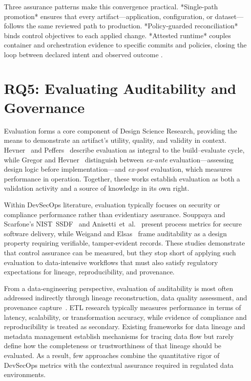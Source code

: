 Three assurance patterns make this convergence practical. *Single-path
promotion* ensures that every artifact—application, configuration, or
dataset—follows the same reviewed path to production. *Policy-guarded
reconciliation* binds control objectives to each applied change.
*Attested runtime* couples container and orchestration evidence to specific
commits and policies, closing the loop between declared intent and observed
outcome \cite{anisetti_devsecops-based_2022, souppaya_secure_2022}.

\section{RQ5: Evaluating Auditability and Governance}

Evaluation forms a core component of Design Science Research, providing the
means to demonstrate an artifact's utility, quality, and validity in context.
Hevner~\cite{hevner_design_2004} and Peffers~\cite{peffers_design_2007}
describe evaluation as integral to the build–evaluate cycle, while
Gregor and Hevner~\cite{gregor_positioning_2013} distinguish between
\textit{ex-ante} evaluation—assessing design logic before implementation—and
\textit{ex-post} evaluation, which measures performance in operation.
Together, these works establish evaluation as both a validation activity and a
source of knowledge in its own right.

Within DevSecOps literature, evaluation typically focuses on security or
compliance performance rather than evidentiary assurance.
Souppaya and Scarfone's NIST~SSDF~\cite{souppaya_secure_2022} and
Anisetti~et~al.~\cite{anisetti_devsecops-based_2022} present process metrics for
secure software delivery, while Weigand and
Elsas~\cite{weigand_auditability_2019} frame auditability as a design property
requiring verifiable, tamper-evident records.
These studies demonstrate that control assurance can be measured, but they stop
short of applying such evaluation to data-intensive workflows that must also
satisfy regulatory expectations for lineage, reproducibility, and provenance.

From a data-engineering perspective, evaluation of auditability is most often
addressed indirectly through lineage reconstruction, data quality assessment,
and provenance capture~\cite{elbaghazaoui_metadata_2025,
elbaghazaoui_data_2025-1, mahmud_role_2022}.
ETL research typically measures performance in terms of latency, scalability,
or transformation accuracy, while evidence of compliance and reproducibility is
treated as secondary.
Existing frameworks for data lineage and metadata management establish
mechanisms for tracing data flow but rarely define how the completeness or
trustworthiness of that lineage should be evaluated\cite{wang_enabling_2011}.
As a result, few approaches combine the quantitative rigor of DevSecOps metrics
with the contextual assurance required in regulated data environments.

